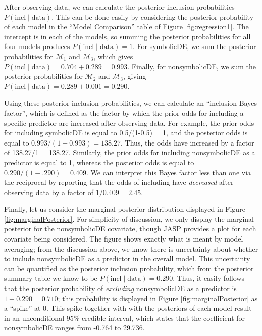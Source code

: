 \documentclass[english,,doc,floatsintext]{apa6}
\begin{document}
After observing data, we can calculate the posterior inclusion probabilities \(P(\text{incl}\mid \text{data})\). This can be done easily by considering the posterior probability of each model in the \enquote{Model Comparison} table of Figure \ref{fig:regression1}. The intercept is in each of the models, so summing the posterior probabilities for all four models produces \(P(\text{incl}\mid \text{data}) = 1\). For symbolicDE, we sum the posterior probabilities for \(\mathcal{M}_{1}\) and \(\mathcal{M}_{3}\), which gives \(P(\text{incl}\mid \text{data}) = 0.704 + 0.289 = 0.993\). Finally, for nonsymbolicDE, we sum the posterior probabilities for \(\mathcal{M}_{2}\) and \(\mathcal{M}_{3}\), giving \(P(\text{incl}\mid \text{data}) = 0.289 + 0.001 = 0.290\).

Using these posterior inclusion probabilities, we can calculate an \enquote{inclusion Bayes factor}, which is defined as the factor by which the prior odds for including a specific predictor are increased after observing data. For example, the prior odds for including symbolicDE is equal to 0.5/(1-0.5) = 1, and the posterior odds is equal to \(0.993/(1-0.993) = 138.27\). Thus, the odds have increased by a factor of 138.27/1 = 138.27. Similarly, the prior odds for including nonsymbolicDE as a predictor is equal to 1, whereas the posterior odds is equal to \(0.290/(1-.290) = 0.409\). We can interpret this Bayes factor less than one via the reciprocal by reporting that the odds of including have \emph{decreased} after observing data by a factor of \(1/0.409 = 2.45\).

Finally, let us consider the marginal posterior distribution displayed in Figure \ref{fig:marginalPosterior}. For simplicity of discussion, we only display the marginal posterior for the nonsymbolicDE covariate, though JASP provides a plot for each covariate being considered. The figure shows exactly what is meant by model averaging; from the discussion above, we know there is uncertainty about whether to include nonsymbolicDE as a predictor in the overall model. This uncertainty can be quantified as the posterior inclusion probability, which from the posterior summary table we know to be \(P(\text{incl}\mid \text{data}) = 0.290\). Thus, it easily follows that the posterior probability of \emph{excluding} nonsymbolicDE as a predictor is \(1-0.290 = 0.710\); this probability is displayed in Figure \ref{fig:marginalPosterior} as a \enquote{spike} at 0. This spike together with with the posteriors of each model result in an unconditional 95\% credible interval, which states that the coefficient for nonsymbolicDE ranges from -0.764 to 29.736.
\end{document}
